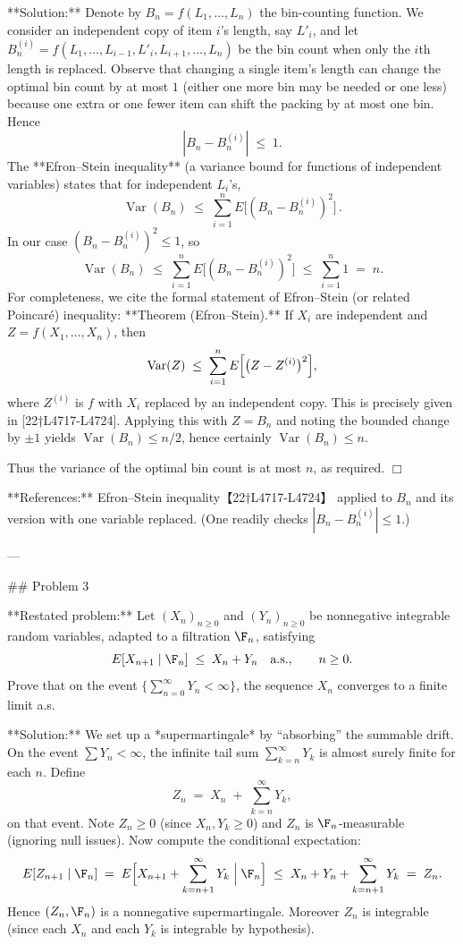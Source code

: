 \documentclass[11pt]{article}
\DeclareMathOperator{\Var}{Var}
\begin{document}
**Solution:** Denote by $B_n=f(L_1,\dots,L_n)$ the bin-counting function. We consider an independent copy of item $i$’s length, say $L'_i$, and let $B_n^{(i)} = f(L_1,\dots,L_{i-1},L'_i,L_{i+1},\dots,L_n)$ be the bin count when only the $i$th length is replaced. Observe that changing a single item’s length can change the optimal bin count by at most $1$ (either one more bin may be needed or one less) because one extra or one fewer item can shift the packing by at most one bin. Hence
\[
|B_n - B_n^{(i)}|\;\le\;1.
\]
The **Efron–Stein inequality** (a variance bound for functions of independent variables) states that for independent $L_i$’s,
\[
\Var(B_n)\;\le\; \sum_{i=1}^n E\bigl[(B_n - B_n^{(i)})^2\bigr]\,.
\]
In our case $(B_n - B_n^{(i)})^2\le 1$, so
\[
\Var(B_n) \;\le\; \sum_{i=1}^n E\bigl[(B_n - B_n^{(i)})^2\bigr]
\;\le\; \sum_{i=1}^n 1
\;=\; n.
\]
For completeness, we cite the formal statement of Efron–Stein (or related Poincaré) inequality: **Theorem (Efron–Stein).** If $X_i$ are independent and $Z=f(X_1,\dots,X_n)$, then
\[
\Var(Z)\;\le\;\sum_{i=1}^n E\Bigl[\bigl(Z - Z^{(i)}\bigr)^2\Bigr],
\]
where $Z^{(i)}$ is $f$ with $X_i$ replaced by an independent copy. This is precisely given in [22†L4717-L4724]. Applying this with $Z=B_n$ and noting the bounded change by $\pm1$ yields $\Var(B_n)\le n/2$, hence certainly $\Var(B_n)\le n$.

Thus the variance of the optimal bin count is at most $n$, as required. $\Box$

**References:** Efron–Stein inequality【22†L4717-L4724】 applied to $B_n$ and its version with one variable replaced. (One readily checks $|B_n - B_n^{(i)}|\le1$.)

---

\#\# Problem 3

**Restated problem:** Let $(X_n)_{n\ge0}$ and $(Y_n)_{n\ge0}$ be nonnegative integrable random variables, adapted to a filtration $\F_n$, satisfying
\[
E[X_{n+1}\mid \F_n] \;\le\; X_n + Y_n \quad\text{a.s.},\qquad n\ge0.
\]
Prove that on the event $\{\sum_{n=0}^\infty Y_n<\infty\}$, the sequence $X_n$ converges to a finite limit a.s.

**Solution:** We set up a *supermartingale* by “absorbing” the summable drift. On the event $\sum Y_n<\infty$, the infinite tail sum $\sum_{k=n}^\infty Y_k$ is almost surely finite for each $n$. Define
\[
Z_n \;=\; X_n \;+\;\sum_{k=n}^\infty Y_k,
\]
on that event. Note $Z_n\ge0$ (since $X_n,Y_k\ge0$) and $Z_n$ is $\F_n$-measurable (ignoring null issues). Now compute the conditional expectation:
\[
E[Z_{n+1}\mid \F_n] \;=\; E\Bigl[X_{n+1} + \sum_{k=n+1}^\infty Y_k \;\Big|\;\F_n\Bigr]
\;\le\; X_n + Y_n + \sum_{k=n+1}^\infty Y_k
\;=\; Z_n.
\]
Hence $(Z_n,\F_n)$ is a nonnegative supermartingale. Moreover $Z_n$ is integrable (since each $X_n$ and each $Y_k$ is integrable by hypothesis).
\end{document}
